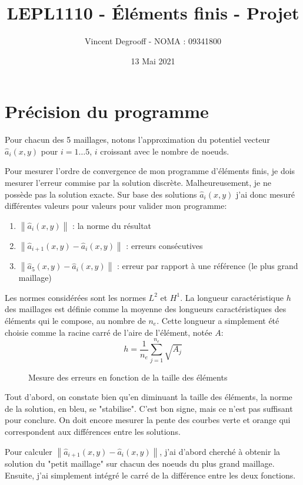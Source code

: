\documentclass[11 pt]{article}
\title{LEPL1110 - Éléments finis - Projet}
\author{Vincent Degrooff - NOMA : 09341800}
\date{13 Mai 2021}
\begin{document}
\maketitle

\section{Précision du programme}
Pour chacun des 5 maillages, notons l'approximation du potentiel vecteur $\hat{a}_i(x, y)$ pour $i=1 \dots 5$, $i$ croissant avec le nombre de noeuds.

Pour mesurer l'ordre de convergence de mon programme d'éléments finis, je dois mesurer l'erreur commise par la solution discrète. Malheureusement, je ne possède pas la solution exacte. Sur base des solutions $\hat{a}_i(x,y)$ j'ai donc mesuré différentes valeurs pour valeurs pour valider mon programme: 

\begin{enumerate}
    \item $\left\| \hat{a}_i(x,y) \right\|$ :  la norme du résultat
    \item $\left\| \hat{a}_{i+1}(x,y) - \hat{a}_i(x,y) \right\|$ : erreurs consécutives
    \item $\left\| \hat{a}_{5}(x,y) - \hat{a}_i(x,y) \right\|$ : erreur par rapport à une référence (le plus grand maillage)
\end{enumerate}

Les normes considérées sont les normes $L^2$ et $H^1$. La longueur caractéristique $h$ des maillages est définie comme la moyenne des longueurs caractéristiques des éléments qui le compose, au nombre de $n_e$. Cette longueur a simplement été choisie comme la racine carré de l'aire de l'élément, notée $A$:
$$h = \frac{1}{n_e} \sum_{j=1}^{n_e} \sqrt{A_j}$$

\begin{figure}[!h]
    \centering
    
    \caption{Mesure des erreurs en fonction de la taille des éléments}
\end{figure}

Tout d'abord, on constate bien qu'en diminuant la taille des éléments, la norme de la solution, en bleu, se "stabilise". C'est bon signe, mais ce n'est pas suffisant pour conclure. On doit encore mesurer la pente des courbes verte et orange qui correspondent aux différences entre les solutions.

Pour calculer $\left \| \hat{a}_{i+1}(x,y) - \hat{a}_{i}(x,y) \right \|$, j'ai d'abord cherché à obtenir la solution du "petit maillage" sur chacun des noeuds du plus grand maillage. Ensuite, j'ai simplement intégré le carré de la différence entre les deux fonctions.
\end{document}
